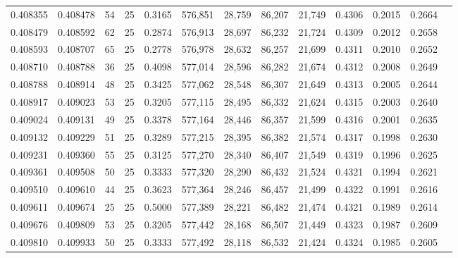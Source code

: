 \begin{tabular}{rrrrrrrrrrrrr}
0.408355 & 0.408478 &    54 &  25 &                                     0.3165 & 576,851 &  28,759 &  86,207 &  21,749 & 0.4306 & 0.2015 & 0.2664 \\
0.408479 & 0.408592 &    62 &  25 &                                     0.2874 & 576,913 &  28,697 &  86,232 &  21,724 & 0.4309 & 0.2012 & 0.2658 \\
0.408593 & 0.408707 &    65 &  25 &                                     0.2778 & 576,978 &  28,632 &  86,257 &  21,699 & 0.4311 & 0.2010 & 0.2652 \\
0.408710 & 0.408788 &    36 &  25 &                                     0.4098 & 577,014 &  28,596 &  86,282 &  21,674 & 0.4312 & 0.2008 & 0.2649 \\
0.408788 & 0.408914 &    48 &  25 &                                     0.3425 & 577,062 &  28,548 &  86,307 &  21,649 & 0.4313 & 0.2005 & 0.2644 \\
0.408917 & 0.409023 &    53 &  25 &                                     0.3205 & 577,115 &  28,495 &  86,332 &  21,624 & 0.4315 & 0.2003 & 0.2640 \\
0.409024 & 0.409131 &    49 &  25 &                                     0.3378 & 577,164 &  28,446 &  86,357 &  21,599 & 0.4316 & 0.2001 & 0.2635 \\
0.409132 & 0.409229 &    51 &  25 &                                     0.3289 & 577,215 &  28,395 &  86,382 &  21,574 & 0.4317 & 0.1998 & 0.2630 \\
0.409231 & 0.409360 &    55 &  25 &                                     0.3125 & 577,270 &  28,340 &  86,407 &  21,549 & 0.4319 & 0.1996 & 0.2625 \\
0.409361 & 0.409508 &    50 &  25 &                                     0.3333 & 577,320 &  28,290 &  86,432 &  21,524 & 0.4321 & 0.1994 & 0.2621 \\
0.409510 & 0.409610 &    44 &  25 &                                     0.3623 & 577,364 &  28,246 &  86,457 &  21,499 & 0.4322 & 0.1991 & 0.2616 \\
0.409611 & 0.409674 &    25 &  25 &                                     0.5000 & 577,389 &  28,221 &  86,482 &  21,474 & 0.4321 & 0.1989 & 0.2614 \\
0.409676 & 0.409809 &    53 &  25 &                                     0.3205 & 577,442 &  28,168 &  86,507 &  21,449 & 0.4323 & 0.1987 & 0.2609 \\
0.409810 & 0.409933 &    50 &  25 &                                     0.3333 & 577,492 &  28,118 &  86,532 &  21,424 & 0.4324 & 0.1985 & 0.2605 \\

\end{tabular}
